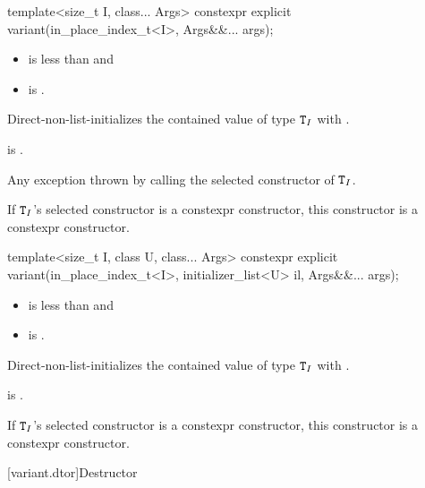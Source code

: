 %
\begin{itemdecl}
template<size_t I, class... Args> constexpr explicit variant(in_place_index_t<I>, Args&&... args);
\end{itemdecl}

\begin{itemdescr}
\pnum
\constraints
\begin{itemize}
\item
{} is less than  and
\item
{} is .
\end{itemize}

\pnum
\effects
Direct-non-list-initializes the contained value of type $\texttt{T}_I$
with .

\pnum
\ensures
{} is .

\pnum
\throws
Any exception thrown by calling the selected constructor of $\texttt{T}_I$.

\pnum
\remarks
If $\texttt{T}_I$'s selected constructor is a constexpr constructor, this
constructor is a constexpr constructor.
\end{itemdescr}

%
\begin{itemdecl}
template<size_t I, class U, class... Args>
  constexpr explicit variant(in_place_index_t<I>, initializer_list<U> il, Args&&... args);
\end{itemdecl}

\begin{itemdescr}
\pnum
\constraints
\begin{itemize}
\item
{} is less than  and
\item
{} is .
\end{itemize}

\pnum
\effects
Direct-non-list-initializes the contained value of type $\texttt{T}_I$
with .

\pnum
\ensures
{} is .

\pnum
\remarks
If $\texttt{T}_I$'s selected constructor is a constexpr constructor, this
constructor is a constexpr constructor.
\end{itemdescr}

[variant.dtor]{Destructor}

